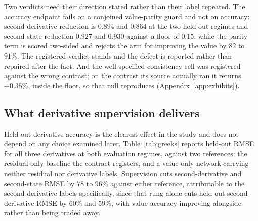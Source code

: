 \documentclass{article}
\begin{document}
Two verdicts need their direction stated rather than their label repeated. The
accuracy endpoint fails on a conjoined value-parity guard and not on accuracy:
second-derivative reduction is $0.894$ and $0.864$ at the two held-out regimes and
second-state reduction $0.927$ and $0.930$ against a floor of $0.15$, while the
parity term is scored two-sided and rejects the arm for improving the value by $82$
to $91\%$. The registered verdict stands and the defect is reported rather than
repaired after the fact. And the well-specified consistency cell was registered
against the wrong contrast; on the contrast its source actually ran it returns
$+0.35\%$, inside the floor, so that null reproduces
(Appendix~\ref{app:exhibits}).

\subsection{What derivative supervision delivers}
\label{sec:delivers}

Held-out derivative accuracy is the clearest effect in the study and does not depend
on any choice examined later. Table~\ref{tab:greeks} reports held-out RMSE for all
three derivatives at both evaluation regimes, against two references: the
residual-only baseline the contract registers, and a value-only network carrying
neither residual nor derivative labels. Supervision cuts second-derivative and
second-state RMSE by $78$ to $96\%$ against either reference, attributable to the
second-derivative labels specifically, since that rung alone cuts held-out
second-derivative RMSE by $60\%$ and $59\%$, with value accuracy improving
alongside rather than being traded away.
\end{document}
